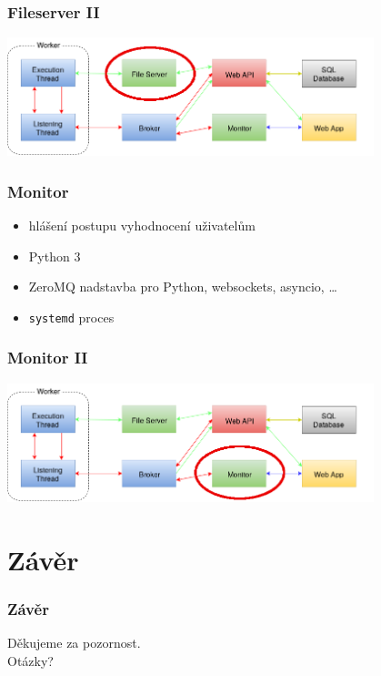 \documentclass{beamer}
\begin{document}
\begin{frame}
	\frametitle{Fileserver II}
	\begin{center}
		\includegraphics[width=0.8\textwidth]{images/communication-fileserver.png}
	\end{center}
\end{frame}

\begin{frame}
	\frametitle{Monitor}
	\begin{itemize}
		\item hlášení postupu vyhodnocení uživatelům
		\item Python 3
		\item ZeroMQ nadstavba pro Python, websockets, asyncio, \dots
		\item \texttt{systemd} proces
	\end{itemize}
\end{frame}

\begin{frame}
	\frametitle{Monitor II}
	\begin{center}
		\includegraphics[width=0.8\textwidth]{images/communication-monitor.png}
	\end{center}
\end{frame}

\section{Závěr}
\begin{frame}
	\frametitle{Závěr}
	\centering
	Děkujeme za pozornost.\\
	\LARGE{Otázky?}
\end{frame}
\end{document}
